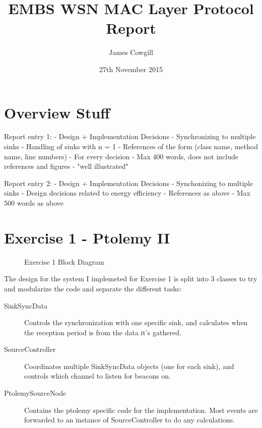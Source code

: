 \documentclass[a4paper,12pt,draft,DIV=calc]{scrartcl}
\begin{document}
\title{EMBS WSN MAC Layer Protocol Report}
\author{James Cowgill}
\date{27th November 2015}
\maketitle

\section{Overview Stuff}
Report entry 1:
 - Design + Implementation Decisions
   - Synchronizing to multiple sinks
   - Handling of sinks with n = 1
 - References of the form (class name, method name, line numbers)
   - For every decision
 - Max 400 words, does not include references and figures
 - "well illustrated"

Report entry 2:
 - Design + Implementation Decisions
   - Synchonizing to multiple sinks
   - Design decisions related to energy efficiency
 - References as above
 - Max 500 words as above

\section{Exercise 1 - Ptolemy II}
\begin{figure}[ht]
  \centering
  \caption{Exercise 1 Block Diagram}
\end{figure}

The design for the system I implemeted for Exercise 1 is split into 3 classes to
try and modularize the code and separate the different tasks:
\begin{description}
  \item[SinkSyncData]
    Controls the synchronization with one specific sink, and calculates when
    the reception period is from the data it's gathered.
  \item[SourceController]
    Coordinates multiple SinkSyncData objects (one for each sink), and
    controls which channel to listen for beacons on.
  \item[PtolemySourceNode]
    Contains the ptolemy specific code for the implementation. Most events are
    forwarded to an instance of SourceController to do any calculations.
\end{description}
\end{document}
